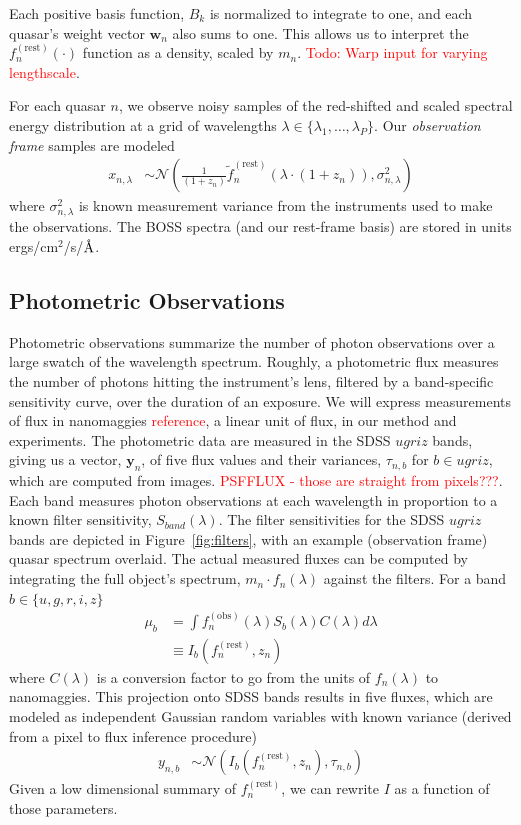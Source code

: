 \documentclass{article}
\newcommand{\angstrom}{\textup{\AA}}
\newcommand{\red}[1]{\textcolor{red}{#1}}
\begin{document}
Each positive basis function, $B_k$ is normalized to integrate to one, and each quasar's weight vector $\mathbf{w}_n$ also sums to one.  This allows us to interpret the $f^{(\text{rest})}_n(\cdot)$ function as a density, scaled by $m_n$. 
\red{Todo: Warp input for varying lengthscale}.  

For each quasar $n$, we observe noisy samples of the red-shifted and scaled spectral energy distribution at a grid of wavelengths $\lambda \in \{\lambda_1, \dots, \lambda_P \}$.  Our \emph{observation frame} samples are modeled
\begin{align}
  x_{n, \lambda} 
    &\sim \mathcal{N}\left( \frac{1}{(1 + z_n)} \tilde f_n^{(\text{rest})}( \lambda \cdot (1 + z_n) ), \sigma_{n,\lambda}^2 \right)
    \label{eq:spec} 
\end{align}
where $\sigma_{n, \lambda}^2$ is known measurement variance from the instruments
used to make the observations.
The BOSS spectra (and our rest-frame basis) are stored in units ergs/cm$^2$/s/$\angstrom$. 

\subsection{Photometric Observations}
Photometric observations summarize the number of photon observations over a large swatch of the wavelength spectrum.  Roughly, a photometric flux measures the number of photons hitting the instrument's lens, filtered by a band-specific sensitivity curve, over the duration of an exposure. 
We will express measurements of flux in nanomaggies \red{reference}, a linear unit of flux, in our method and experiments.  
The photometric data are measured in the SDSS $ugriz$ bands, giving us a vector, $\mathbf{y}_n$, of five flux values and their variances, $\tau_{n, b}$ for $b \in ugriz$, which are computed from images. \red{PSFFLUX - those are straight from pixels???}.  
Each band measures photon observations at each wavelength in proportion to a known filter sensitivity, $S_{band}(\lambda)$. 
The filter sensitivities for the SDSS $ugriz$ bands are depicted in Figure~\ref{fig:filters}, with an example (observation frame) quasar spectrum overlaid.   The actual measured fluxes can be computed by integrating the full object's spectrum, $m_n \cdot f_n(\lambda)$ against the filters.  For a band $b \in \{u, g, r, i, z \}$
\begin{align}
  \mu_b &= \int f^{(\text{obs})}_n(\lambda) S_b(\lambda) C(\lambda) d \lambda  \\
        &\equiv I_b(f_n^{(\text{rest})}, z_n)
\end{align}
where $C(\lambda)$ is a conversion factor to go from the units of $f_n(\lambda)$ to nanomaggies.  This projection onto SDSS bands results in five fluxes, which are modeled as independent Gaussian random variables with known variance (derived from a pixel to flux inference procedure)
\begin{align}
  y_{n,b} &\sim \mathcal{N}( I_b(f_n^{(\text{rest})}, z_n), \tau_{n,b} )
  \label{eq:phot}
\end{align}
Given a low dimensional summary of $f_n^{(\text{rest})}$, we can rewrite $I$ as a function of those parameters. 
\end{document}
